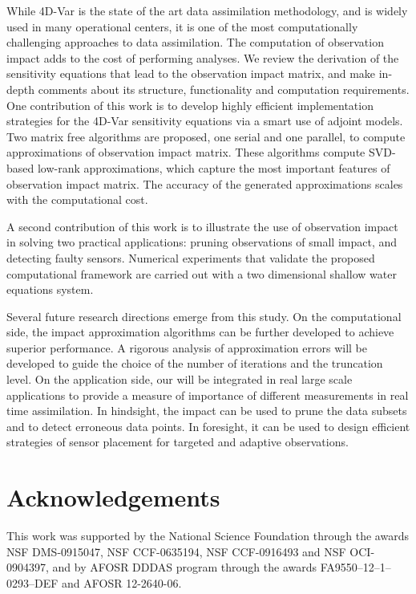 \documentclass[final,sort&compress]{elsarticle}
\begin{document}
While 4D-Var is the state of the art data assimilation methodology, and is widely used in many operational centers, it is one of the most computationally challenging approaches to data assimilation. The computation of observation impact adds to the cost of performing analyses.
We review the derivation of the sensitivity equations that lead to the observation impact matrix,
and make in-depth comments about its structure, functionality and computation requirements.
One contribution of this work is to develop highly efficient implementation strategies for the
4D-Var sensitivity equations via a smart use of adjoint models. Two matrix free algorithms are proposed, one
serial and one parallel, to compute approximations of observation impact matrix.
These algorithms compute SVD-based low-rank approximations, which capture the most important features of observation impact matrix.
The accuracy of the generated approximations scales with the computational cost.

A second contribution of this work is to illustrate the use of observation impact 
in solving two practical applications: pruning observations of small impact, and detecting faulty sensors. 
Numerical experiments that validate the proposed computational framework are carried out with a two dimensional 
shallow water equations system.

Several future research directions emerge from this study.
On the computational side, the impact approximation algorithms can be further developed to achieve superior performance.
A rigorous analysis of approximation errors will be developed to guide the choice of the number of iterations and
the truncation level.
On the application side, our will be integrated in real large scale applications to provide a measure of importance 
of different measurements in real time assimilation.
In hindsight, the impact can be used to prune the data subsets and to detect erroneous data points.
In foresight, it can be used to design efficient strategies of sensor placement for targeted and adaptive observations.

\section*{Acknowledgements}

This work was supported by the National Science Foundation through the awards NSF DMS-0915047, NSF CCF-0635194, NSF CCF-0916493 and NSF OCI-0904397,
and by AFOSR DDDAS program through the awards FA9550--12--1--0293--DEF and AFOSR 12-2640-06.





\end{document}
